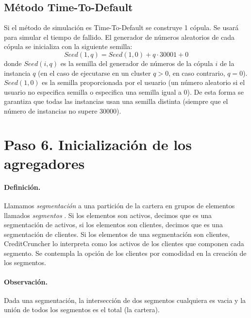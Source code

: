 \subsection{M\'etodo Time-To-Default}

Si el m\'etodo de simulaci\'on es Time-To-Default se construye
1 c\'opula. Se usar\'a para simular el tiempo de fallido.
\newline
\newline
El generador de n\'umeros aleatorios de cada c\'opula se
inicializa con la siguiente semilla:
\begin{displaymath}
Seed(1,q) = Seed(1,0) + q \cdot 30001 + 0
\end{displaymath}
donde $Seed(i,q)$ es la semilla del generador de n\'umeros de la
c\'opula $i$ de la instancia $q$ (en el caso de ejecutarse en un
cluster $q>0$, en caso contrario, $q=0$). $Seed(1,0)$ es la semilla
proporcionada por el usuario (un n\'umero aleatorio si el usuario no
especifica semilla o especifica una semilla igual a 0). De esta
forma se garantiza que todas las instancias usan una semilla distinta
(siempre que el n\'umero de instancias no supere 30000).


\section{Paso 6. Inicializaci\'on de los agregadores}

\paragraph{Definici\'on.} Llamamos \emph{segmentaci\'on}
a una partici\'on de la cartera en grupos de elementos llamados \emph{segmentos}
. Si los elementos son activos, decimos que es una segmentaci\'on
de activos, si los elementos son clientes, decimos que es una segmentaci\'on de
clientes. Si los elementos de una segmentaci\'on son clientes, CreditCruncher lo
interpreta como los activos de los clientes que componen cada segmento. Se contempla
la opci\'on de los clientes por comodidad en la creaci\'on de los segmentos.

\paragraph{Observaci\'on.} Dada una segmentaci\'on, la intersecci\'on
de dos segmentos cualquiera es vacia y la uni\'on de todos los
segmentos es el total (la cartera).

